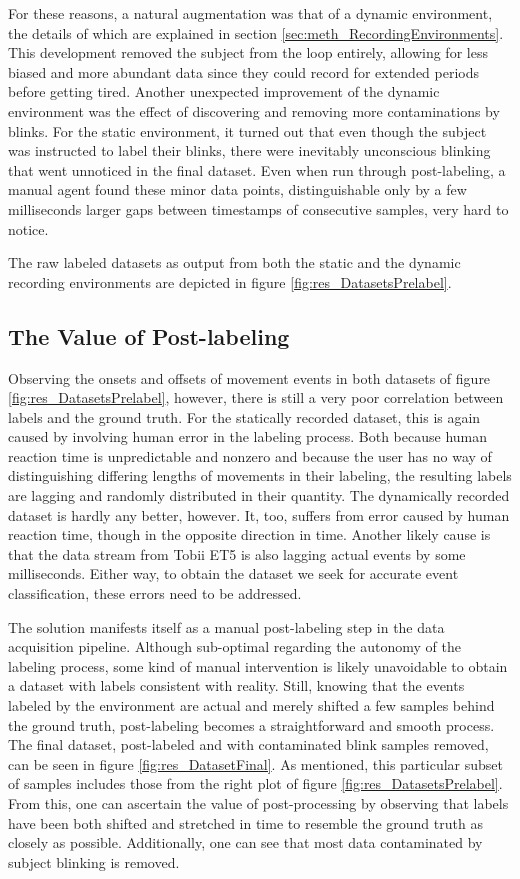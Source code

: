 For these reasons, a natural augmentation was that of a dynamic environment, the details of which are explained in section \ref{sec:meth_RecordingEnvironments}. This development removed the subject from the loop entirely, allowing for less biased and more abundant data since they could record for extended periods before getting tired. Another unexpected improvement of the dynamic environment was the effect of discovering and removing more contaminations by blinks. For the static environment, it turned out that even though the subject was instructed to label their blinks, there were inevitably unconscious blinking that went unnoticed in the final dataset. Even when run through post-labeling, a manual agent found these minor data points, distinguishable only by a few milliseconds larger gaps between timestamps of consecutive samples, very hard to notice. 

The raw labeled datasets as output from both the static and the dynamic recording environments are depicted in figure \ref{fig:res_DatasetsPrelabel}.

\subsection{The Value of Post-labeling}

Observing the onsets and offsets of movement events in both datasets of figure \ref{fig:res_DatasetsPrelabel}, however, there is still a very poor correlation between labels and the ground truth. For the statically recorded dataset, this is again caused by involving human error in the labeling process. Both because human reaction time is unpredictable and nonzero and because the user has no way of distinguishing differing lengths of movements in their labeling, the resulting labels are lagging and randomly distributed in their quantity. The dynamically recorded dataset is hardly any better, however. It, too, suffers from error caused by human reaction time, though in the opposite direction in time. Another likely cause is that the data stream from Tobii ET5 is also lagging actual events by some milliseconds. Either way, to obtain the dataset we seek for accurate event classification, these errors need to be addressed.

The solution manifests itself as a manual post-labeling step in the data acquisition pipeline. Although sub-optimal regarding the autonomy of the labeling process, some kind of manual intervention is likely unavoidable to obtain a dataset with labels consistent with reality. Still, knowing that the events labeled by the environment are actual and merely shifted a few samples behind the ground truth, post-labeling becomes a straightforward and smooth process. The final dataset, post-labeled and with contaminated blink samples removed, can be seen in figure \ref{fig:res_DatasetFinal}. As mentioned, this particular subset of samples includes those from the right plot of figure \ref{fig:res_DatasetsPrelabel}. From this, one can ascertain the value of post-processing by observing that labels have been both shifted and stretched in time to resemble the ground truth as closely as possible. Additionally, one can see that most data contaminated by subject blinking is removed.

